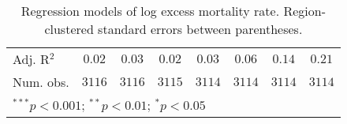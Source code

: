 \begin{table}
\begin{center}
\begin{tabular}{l c c c c c c c}
Adj. R$^2$     & $0.02$       & $0.03$       & $0.02$       & $0.03$       & $0.06$        & $0.14$        & $0.21$        \\
Num. obs.      & $3116$       & $3116$       & $3115$       & $3114$       & $3114$        & $3114$        & $3114$        \\
\hline
\multicolumn{8}{l}{\scriptsize{$^{***}p<0.001$; $^{**}p<0.01$; $^{*}p<0.05$}}
\end{tabular}
\caption{Regression models of log excess mortality rate. Region-clustered standard errors between parentheses.}
\label{tab:basemodels}
\end{center}
\end{table}
